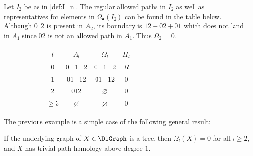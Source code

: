 \begin{example}\label{ex:homology_In}
Let $I_2$ be as in \cref{def:I_n}. The regular allowed paths in $I_2$ as well as representatives for elements in $\Omega_\bullet (I_2)$ can be found in the table below.
Although $012$ is present in $A_2$, its boundary is $12 - 02 + 01$ which does not land in $A_1$ since $02$ is not an allowed path in $A_1$.
Thus $\Omega_2 = 0$.

\begin{figure}[H]
\centering
 \begin{subfigure}[c]{0.4\textwidth}
\end{subfigure}
\begin{subfigure}[c]{0.5\textwidth}
    \centering
\begin{tabular}{||c||  c | c | c ||} 
 \hline
 $l$ &  $A_l$ & $\Omega_l$ & $H_l$ \\ [.5ex] 
 \hline\hline
0 &  0 \, 1 \, 2  & 0 \, 1 \, 2 & $R$  \\ 
 \hline
 1 &  01 \, 12  & 01 \, 12 & 0  \\
 \hline
 $2$ & 012 & $\varnothing$ & 0 \\
 \hline
 $\geq 3$ & $\varnothing$ & $\varnothing$ & 0 \\
 \hline
\end{tabular}
\end{subfigure}
\end{figure}
\end{example}

The previous example is a simple case of the following general result:

\begin{lemma}\label{rmk:tree_homology} 
If the underlying graph of $X \in \DiGraph$ is a tree, then $\Omega_l(X) = 0$ for all $l \geq 2$, and $X$ has trivial path homology above degree $1$.
\end{lemma}

